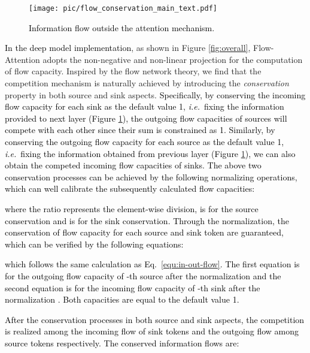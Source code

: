 \documentclass[nohyperref]{article}
\theoremstyle{plain}
\theoremstyle{definition}
\theoremstyle{remark}
\newcommand{\update}[1]{{\textcolor{black}{#1}}}
\begin{document}
\begin{figure}[ht]
    \begin{center}
    \centerline{\texttt{[image: pic/flow\_conservation\_main\_text.pdf]}}
    \vspace{-5pt}
    \caption{\update{Information flow outside the attention mechanism.}}
    \label{fig:flow_conservation}
    \vspace{-10pt}
    \end{center}
\end{figure}

\update{In the deep model implementation}, as shown in Figure \ref{fig:overall}, Flow-Attention adopts the non-negative and non-linear projection  for the computation of flow capacity. Inspired by the flow network theory, we find that the competition mechanism is naturally achieved by introducing the \emph{conservation} property in both source and sink aspects. \update{Specifically, by conserving the incoming flow capacity for each sink as the default value 1, \emph{i.e.}~fixing the information provided to next layer (Figure \ref{fig:flow_conservation}), the outgoing flow capacities of sources will compete with each other since their sum is constrained as 1. Similarly, by conserving the outgoing flow capacity for each source as the default value 1, \emph{i.e.}~fixing the information obtained from previous layer (Figure \ref{fig:flow_conservation}), we can also obtain the competed incoming flow capacities of sinks. The above two conservation processes can be achieved by the following normalizing operations, which can well calibrate the subsequently calculated flow capacities:}

\update{where the ratio represents the element-wise division,  is for the source conservation and  is for the sink conservation.
Through the normalization, the conservation of flow capacity for each source and sink token are guaranteed, which can be verified by the following equations:}

\update{which follows the same calculation as Eq.~\eqref{equ:in-out-flow}. The first equation is for the outgoing flow capacity of -th source after the normalization  and the second equation is for the incoming flow capacity of -th sink after the normalization . Both capacities are equal to the default value 1.}

\update{After the conservation processes in both source and sink aspects, the competition is realized among the incoming flow of sink tokens and the outgoing flow among source tokens respectively. The conserved information flows are:}
\end{document}

